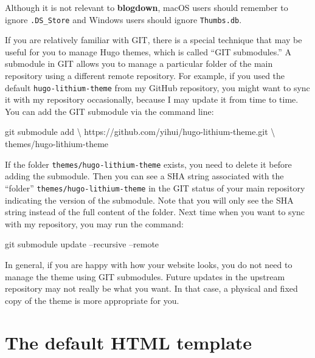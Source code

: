 \documentclass[12pt,]{krantz}
\makeatletter
\newenvironment{Shaded}{\begin{snugshade}}{\end{snugshade}}
\newcommand{\FunctionTok}[1]{\textcolor[rgb]{0.00,0.00,0.00}{#1}}
\newcommand{\NormalTok}[1]{#1}
\newenvironment{kframe}{%
\medskip{}
\setlength{\fboxsep}{.8em}
 \def\at@end@of@kframe{}%
 \ifinner\ifhmode%
  \def\at@end@of@kframe{\end{minipage}}%
  \begin{minipage}{\columnwidth}%
 \fi\fi%
 \def\FrameCommand##1{\hskip\@totalleftmargin \hskip-\fboxsep
 \colorbox{shadecolor}{##1}\hskip-\fboxsep
     \hskip-\linewidth \hskip-\@totalleftmargin \hskip\columnwidth}%
 \MakeFramed {\advance\hsize-\width
   \@totalleftmargin\z@ \linewidth\hsize
   \@setminipage}}%
 {\par\unskip\endMakeFramed%
 \at@end@of@kframe}
\renewenvironment{Shaded}{\begin{kframe}}{\end{kframe}}
\theoremstyle{definition}
\theoremstyle{definition}
\theoremstyle{definition}
\theoremstyle{remark}
\makeatother
\begin{document}
Although it is not relevant to \textbf{blogdown}, macOS users should
remember to ignore \texttt{.DS\_Store} and Windows users should ignore
\texttt{Thumbs.db}.

If you are relatively familiar with GIT, there is
a special technique that may be useful for you to manage Hugo themes,
which is called ``GIT submodules.'' A submodule in GIT allows you to
manage a particular folder of the main repository using a different
remote repository. For example, if you used the default
\texttt{hugo-lithium-theme} from my GitHub repository, you might want to
sync it with my repository occasionally, because I may update it from
time to time. You can add the GIT submodule via the command line:

\begin{Shaded}
\begin{Highlighting}[]
\FunctionTok{git}\NormalTok{ submodule add \textbackslash{}}
\NormalTok{  https://github.com/yihui/hugo-lithium-theme.git \textbackslash{}}
\NormalTok{  themes/hugo-lithium-theme}
\end{Highlighting}
\end{Shaded}

If the folder \texttt{themes/hugo-lithium-theme} exists, you need to
delete it before adding the submodule. Then you can see a SHA string
associated with the ``folder'' \texttt{themes/hugo-lithium-theme} in the
GIT status of your main repository indicating the version of the
submodule. Note that you will only see the SHA string instead of the
full content of the folder. Next time when you want to sync with my
repository, you may run the command:

\begin{Shaded}
\begin{Highlighting}[]
\FunctionTok{git}\NormalTok{ submodule update --recursive --remote}
\end{Highlighting}
\end{Shaded}

In general, if you are happy with how your website looks, you do not
need to manage the theme using GIT submodules. Future updates in the
upstream repository may not really be what you want. In that case, a
physical and fixed copy of the theme is more appropriate for you.

\section{The default HTML template}\label{default-template}
\end{document}
